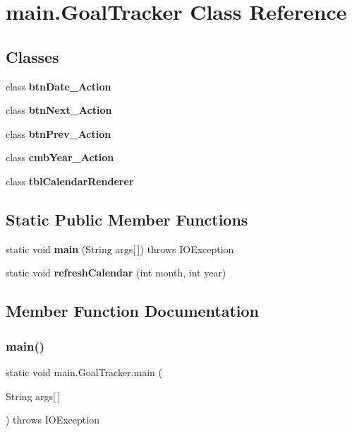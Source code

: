 \section{main.\+Goal\+Tracker Class Reference}
\label{classmain_1_1_goal_tracker}
\subsection*{Classes}
\begin{DoxyCompactItemize}
\item 
class {\bfseries btn\+Date\+\_\+\+Action}
\item 
class {\bfseries btn\+Next\+\_\+\+Action}
\item 
class {\bfseries btn\+Prev\+\_\+\+Action}
\item 
class {\bfseries cmb\+Year\+\_\+\+Action}
\item 
class {\bfseries tbl\+Calendar\+Renderer}
\end{DoxyCompactItemize}
\subsection*{Static Public Member Functions}
\begin{DoxyCompactItemize}
\item 
static void \textbf{ main} (String args[$\,$])  throws I\+O\+Exception 
\item 
static void \textbf{ refresh\+Calendar} (int month, int year)
\end{DoxyCompactItemize}


\subsection{Member Function Documentation}
\mbox{\label{classmain_1_1_goal_tracker_a2039c98750da8b2c3136ff42d2682307}} 
\subsubsection{main()}
{\footnotesize\ttfamily static void main.\+Goal\+Tracker.\+main (\begin{DoxyParamCaption}\item[{String}]{args[$\,$] }\end{DoxyParamCaption}) throws I\+O\+Exception\hspace{0.3cm}{\ttfamily [static]}}

